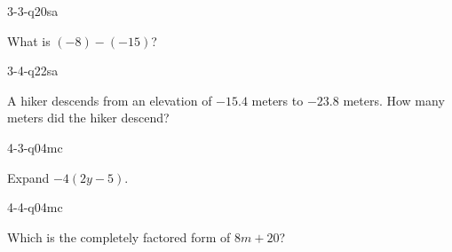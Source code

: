 \begin{practiceQuestion}{3-3-q20}{sa}
\begin{questionText}
What is $(-8) - (-15)$?
\end{questionText}
\end{practiceQuestion}

\begin{practiceQuestion}{3-4-q22}{sa}
\begin{questionText}
A hiker descends from an elevation of $-15.4$ meters to $-23.8$ meters. How many meters did the hiker descend?
\end{questionText}
\end{practiceQuestion}

\begin{practiceQuestion}{4-3-q04}{mc}
\begin{questionText}
Expand $-4(2y - 5)$.
\end{questionText}
\end{practiceQuestion}

\begin{practiceQuestion}{4-4-q04}{mc}
\begin{questionText}
Which is the completely factored form of $8m + 20$?
\end{questionText}
\end{practiceQuestion}

